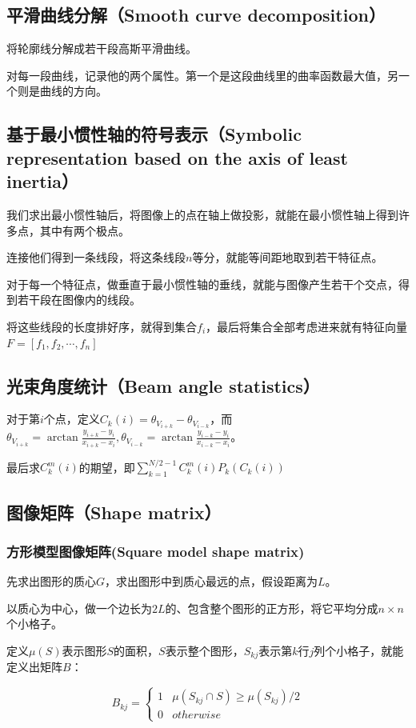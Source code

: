 \documentclass{ctexart}
\begin{document}
\subsection{平滑曲线分解（Smooth curve decomposition）}
将轮廓线分解成若干段高斯平滑曲线。

对每一段曲线，记录他的两个属性。第一个是这段曲线里的曲率函数最大值，另一个则是曲线的方向。
\subsection{基于最小惯性轴的符号表示（Symbolic representation based on the axis of least inertia）}
我们求出最小惯性轴后，将图像上的点在轴上做投影，就能在最小惯性轴上得到许多点，其中有两个极点。

连接他们得到一条线段，将这条线段$n$等分，就能等间距地取到若干特征点。

对于每一个特征点，做垂直于最小惯性轴的垂线，就能与图像产生若干个交点，得到若干段在图像内的线段。

将这些线段的长度排好序，就得到集合$f_i$，最后将集合全部考虑进来就有特征向量$F=[f_1,f_2,\cdots,f_n]$
\subsection{光束角度统计（Beam angle statistics）}
对于第$i$个点，定义$C_k(i)=\theta_{V_{i+k}}-\theta_{V_{i-k}}$，而$\theta_{V_{i+k}}=\arctan\frac{y_{i+k}-y_i}{x_{i+k}-x_i},\theta_{V_{i-k}}=\arctan\frac{y_{i-k}-y_i}{x_{i-k}-x_i}$。

最后求$C_k^m(i)$的期望，即$\sum\limits_{k=1}^{N/2-1}C_k^m(i)P_k(C_k(i))$
\subsection{图像矩阵（Shape matrix）}
\subsubsection{方形模型图像矩阵(Square model shape matrix)}
先求出图形的质心$G$，求出图形中到质心最远的点，假设距离为$L$。

以质心为中心，做一个边长为$2L$的、包含整个图形的正方形，将它平均分成$n \times n$个小格子。

定义$\mu(S)$表示图形$S$的面积，$S$表示整个图形，$S_{kj}$表示第$k$行$j$列个小格子，就能定义出矩阵$B$：

\[B_{kj}=\begin{cases}
1 & \mu(S_{kj}\cap S) \ge \mu(S_{kj})/2 \\ 0 & otherwise
\end{cases}\]
\end{document}
